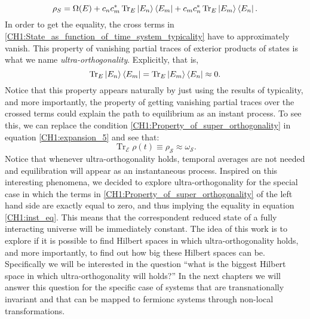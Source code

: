 \begin{equation}
\rho_S= \Omega(E) + c_n c^{*}_m  \operatorname{Tr}_E \mathinner{|{E_n}\rangle}\mathinner{\langle{E_m}|} + c_m c^{*}_n \operatorname{Tr}_E \mathinner{|{E_m}\rangle}\mathinner{\langle{E_n}|}.
\label{CH1:State_as_function_of_time_system_typicality}
\end{equation}
In order to get the equality, the cross terms in \eqref{CH1:State_as_function_of_time_system_typicality} have to  approximately vanish. This property of vanishing partial traces of exterior products of states is what we name \textit{ultra-orthogonality}. Explicitly, that is,
\begin{equation}
\operatorname{Tr}_E \mathinner{|{E_n}\rangle}\mathinner{\langle{E_m}|} = \operatorname{Tr}_E \mathinner{|{E_m}\rangle}\mathinner{\langle{E_n}|} \approx  0.
\label{CH1:Property_of_super_orthogonality}
\end{equation}
Notice that this property appears naturally by just using the results of typicality, and more importantly, the property of getting vanishing partial traces over the crossed terms could explain the path to equilibrium as an instant process. To see this, we can replace the condition \eqref{CH1:Property_of_super_orthogonality} in equation \eqref{CH1:expansion_5} and see that:
\begin{equation}
\operatorname{Tr}_{\mathcal{E}}\rho(t)\equiv \rho_{\mathcal{S}} \approx \omega_{\mathcal{S}}.
\label{CH1:inst_eq}
\end{equation}
Notice that whenever ultra-orthogonality holds, temporal averages are not needed and equilibration will appear as an instantaneous process. Inspired on this interesting phenomena, we decided to explore ultra-orthogonality for the special case in which the terms in \eqref{CH1:Property_of_super_orthogonality} of the left hand side are exactly equal to zero, and thus implying the equality in equation \eqref{CH1:inst_eq}. This means that the correspondent reduced state of a fully interacting universe will be immediately constant. The idea of this work is to explore if it is possible to find Hilbert spaces in which ultra-orthogonality holds, and more importantly, to find out how big these Hilbert spaces can be.\\
\indent Specifically we will be interested in the question ``what is the biggest Hilbert space in which ultra-orthogonality will holds?'' In the next chapters we will answer this question for the specific case of systems that are transnationally invariant and that can be mapped to fermionc systems through non-local transformations. %

